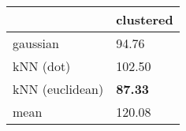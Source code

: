 \begin{tabular}{ll}
\toprule
                & clustered\\
\midrule
gaussian        & 94.76\\
kNN (dot)       & 102.50\\
kNN (euclidean) & \textbf{87.33}\\
mean            & 120.08\\
\bottomrule
\end{tabular}
